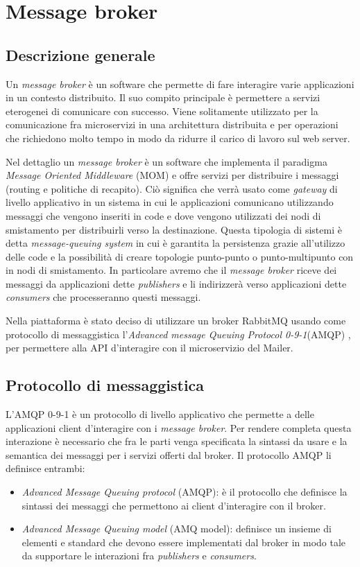 \section{Message broker}
\subsection{Descrizione generale}
Un \textit{message broker} è un software che permette di fare interagire varie applicazioni in
un contesto distribuito. Il suo compito principale è permettere a servizi eterogenei di comunicare con successo.
Viene solitamente utilizzato per la comunicazione fra microservizi in una architettura distribuita
e per operazioni che richiedono molto tempo in modo da ridurre il carico di lavoro sul web server.

Nel dettaglio un \textit{message broker} è un software che implementa il paradigma \textit{Message Oriented Middleware} (MOM) e offre servizi per distribuire i messaggi (routing e politiche di recapito).
Ciò significa che verrà usato come \textit{gateway} di livello applicativo in un sistema in cui le applicazioni comunicano utilizzando messaggi
che vengono inseriti in code e dove vengono utilizzati dei nodi di smistamento per distribuirli verso la destinazione.
Questa tipologia di sistemi è detta \textit{message-queuing system} \cite{MessageBroker-Book} in cui è garantita la persistenza
grazie all'utilizzo delle code e la possibilità di creare topologie punto-punto o punto-multipunto con in nodi di smistamento.
In particolare avremo che il \textit{message broker} riceve dei messaggi da applicazioni dette \textit{publishers} e li indirizzerà verso applicazioni dette \textit{consumers} che processeranno questi messaggi.

Nella piattaforma è stato deciso di utilizzare un broker RabbitMQ \cite{rabbitMQ} usando come protocollo di messaggistica l'\textit{Advanced message Queuing Protocol 0-9-1}(AMQP) \cite{amqp},
per permettere alla API d'interagire con il microservizio del Mailer.

\subsection{Protocollo di messaggistica}
L'AMQP 0-9-1 è un protocollo di livello applicativo che permette a delle applicazioni client d'interagire con i \textit{message broker}.
Per rendere completa questa interazione è necessario che fra le parti venga specificata la sintassi da usare e la semantica dei messaggi per i servizi offerti dal broker.
Il protocollo AMQP li definisce entrambi:
\begin{itemize}
    \itemsep0em
    \item \textit{Advanced Message Queuing protocol} (AMQP): è il protocollo che definisce la sintassi dei messaggi che permettono ai client d'interagire con il broker.
    \item \textit{Advanced Message Queuing model} (AMQ model): definisce un insieme di elementi e standard che devono essere implementati dal broker in modo tale da supportare le interazioni fra \textit{publishers} e \textit{consumers}.
\end{itemize}

